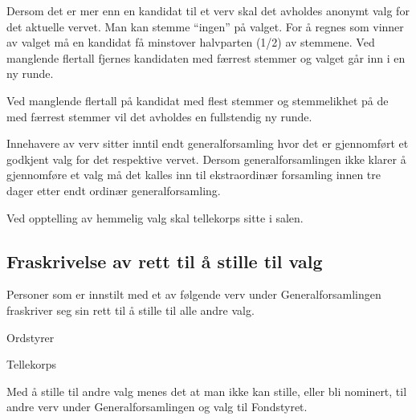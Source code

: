 Dersom det er mer enn en kandidat til et verv skal det avholdes anonymt valg for det aktuelle vervet. Man kan stemme “ingen” på valget. For å regnes som vinner av valget må en kandidat få minstover halvparten (1/2) av stemmene. Ved manglende flertall fjernes kandidaten med færrest stemmer og valget går inn i en ny runde.

Ved manglende flertall på kandidat med flest stemmer og stemmelikhet på de med færrest stemmer vil det avholdes en fullstendig ny runde.

Innehavere av verv sitter inntil endt generalforsamling hvor det er gjennomført et godkjent valg for det respektive vervet. Dersom generalforsamlingen ikke klarer å gjennomføre et valg må det kalles inn til ekstraordinær forsamling innen tre dager etter endt ordinær generalforsamling.

Ved opptelling av hemmelig valg skal tellekorps sitte i salen.

\subsection{Fraskrivelse av rett til å stille til valg}


Personer som er innstilt med et av følgende verv under Generalforsamlingen fraskriver seg sin rett til å stille til alle andre valg.
\begin{liste}
  \item Ordstyrer
  \item Tellekorps
\end{liste}

Med å stille til andre valg menes det at man ikke kan stille, eller bli nominert, til andre verv under Generalforsamlingen og valg til Fondstyret.
